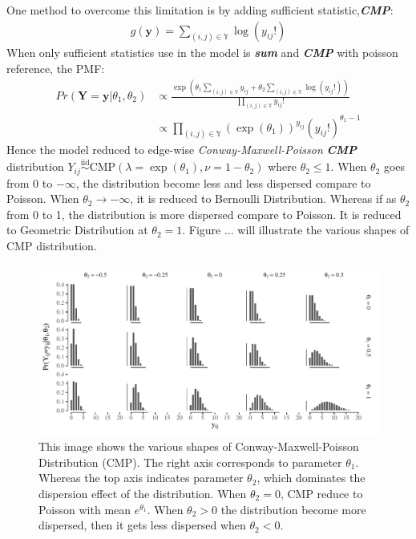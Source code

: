 \documentclass[12pt,a4paper,twoside,openany]{book}\usepackage[]{graphicx}\usepackage[]{color}
\makeatletter
\def\maxwidth{ %
  \ifdim\Gin@nat@width>\linewidth
    \linewidth
  \else
    \Gin@nat@width
  \fi
}
\newenvironment{knitrout}{}{} %
\makeatother
\begin{document}
One method to overcome this limitation is by adding sufficient statistic,\textit{\textbf{CMP}}:
\begin{align}
g(\bm{y}) = \sum_{(i,j) \in \mathbb{Y}} \log(y_{ij}!)
\end{align}
When only sufficient statistics use in the model is \textit{\textbf{sum}} and \textit{\textbf{CMP}} with poisson reference, the PMF:
\begin{align*}
Pr(\bm{Y}=\bm{y}|\theta_1,\theta_2) &\propto \frac{\exp\left(\theta_1 \sum_{(i,j) \in \mathbb{Y}} y_{ij} + \theta_2 \sum_{(i,j) \in \mathbb{Y}} \log(y_{ij}!)\right)}{\prod_{(i,j) \in \mathbb{Y}}y_{ij}!}\\
&\propto \prod_{(i,j) \in \mathbb{Y}} (\exp(\theta_1))^{y_{ij}} (y_{ij}!)^{\theta_1-1}
\end{align*}
Hence the model reduced to edge-wise \textit{Conway-Maxwell-Poisson} \textit{\textbf{CMP}} distribution $Y_{ij}\stackrel{\text{iid}}{\sim}\text{CMP}(\lambda =\exp(\theta_1),\nu = 1-\theta_2)$ where $\theta_2 \le 1$. When $\theta_2$ goes from 0 to $-\infty$, the distribution become less and less dispersed compare to Poisson. When $\theta_2 \to -\infty$, it is reduced to Bernoulli Distribution. Whereas if as $\theta_2$ from 0 to 1, the distribution is more dispersed compare to Poisson. It is reduced  to Geometric Distribution at $\theta_2=1$. Figure ... will illustrate the various shapes of CMP distribution.

\begin{figure}[H]
\begin{knitrout}
\color{fgcolor}

{\centering \includegraphics[width=\maxwidth]{figure/unnamed-chunk-3-1} 

}



\end{knitrout}
\caption ["Illustration of Conway-Maxwell-Poisson Distribution"]{This image shows the various shapes of Conway-Maxwell-Poisson Distribution (CMP). The right axis corresponds to parameter $\theta_1$. Whereas the top axis indicates parameter $\theta_2$, which dominates the dispersion effect of the distribution. When $\theta_2 = 0$, CMP reduce to Poisson with mean $e^{\theta_1}$. When $\theta_2 >0$ the distribution become more dispersed, then it gets less dispersed when $\theta_2<0$.}  
\end{figure}
\end{document}
